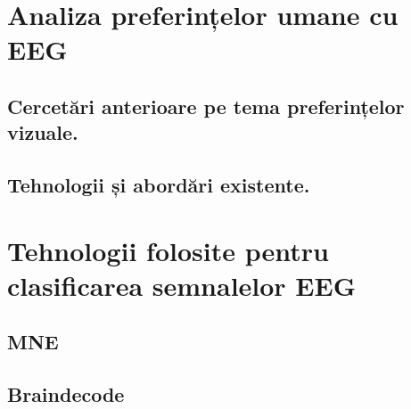 \section{Analiza preferințelor umane cu EEG}
\subsection{Cercetări anterioare pe tema preferințelor vizuale.}

\subsection{Tehnologii și abordări existente.}

\section{Tehnologii folosite pentru clasificarea semnalelor EEG}
\subsection{MNE}
\subsection{Braindecode}